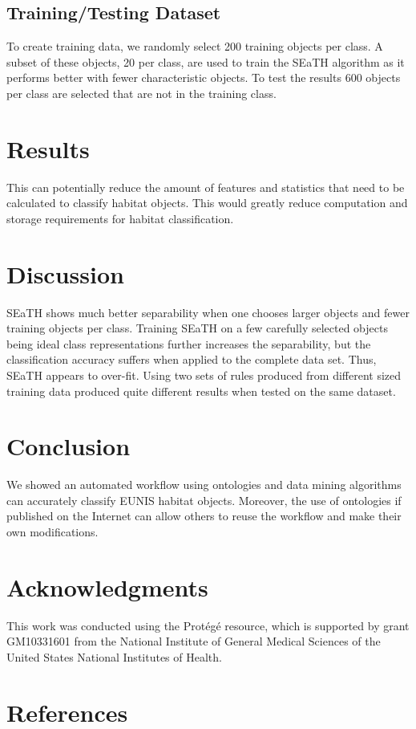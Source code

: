 \documentclass[authoryear, review,12pt,number]{elsarticle}
\begin{document}
\subsection{Training/Testing Dataset}
To create training data, we randomly select 200 training objects per class. A
subset of these objects, 20 per class, are used to train the SEaTH
algorithm as it performs better with fewer characteristic objects. To test the 
results 600 objects per class are selected that are not in the training class.

\section{Results}
This can potentially reduce the amount of features
and statistics that need to be calculated to classify habitat objects. This
would greatly reduce computation and storage requirements for habitat
classification.
\section{Discussion}
SEaTH shows much better separability when one chooses larger objects and fewer
training objects per class. Training SEaTH on a few carefully selected objects
being ideal class representations further increases the separability, but the classification
accuracy suffers when applied to the complete data set. Thus, SEaTH appears to
over-fit. Using two sets of rules produced from different sized training data
produced quite different results when tested on the same dataset.
\section{Conclusion}
We showed an automated workflow using ontologies and data mining algorithms can
accurately classify EUNIS habitat objects. Moreover, the use of ontologies if
published on the Internet can allow others to reuse the workflow and make their own
modifications.
\section{Acknowledgments}
This work was conducted using the Prot\'eg\'e resource, which
is supported by grant GM10331601 from the National Institute of General
Medical Sciences of the United States National Institutes of Health.

\section{References}

\end{document}
